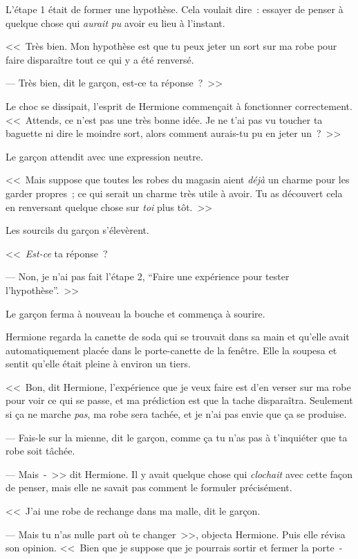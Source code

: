 L'étape 1 était de former une hypothèse. Cela voulait dire~: essayer de penser à quelque chose qui \emph{aurait} \emph{pu} avoir eu lieu à l'instant.

<<~Très bien. Mon hypothèse est que tu peux jeter un sort sur ma robe pour faire disparaître tout ce qui y a été renversé.

--- Très bien, dit le garçon, est-ce ta réponse~?~>>

Le choc se dissipait, l'esprit de Hermione commençait à fonctionner correctement. <<~Attends, ce n'est pas une très bonne idée. Je ne t'ai pas vu toucher ta baguette ni dire le moindre sort, alors comment aurais-tu pu en jeter un~?~>>

Le garçon attendit avec une expression neutre.

<<~Mais suppose que toutes les robes du magasin aient \emph{déjà} un charme pour les garder propres~; ce qui serait un charme très utile à avoir. Tu as découvert cela en renversant quelque chose sur \emph{toi} plus tôt.~>>

Les sourcils du garçon s'élevèrent.

<<~\emph{Est-ce} ta réponse~?

--- Non, je n'ai pas fait l'étape 2, “Faire une expérience pour tester l'hypothèse”.~>>

Le garçon ferma à nouveau la bouche et commença à sourire.

Hermione regarda la canette de soda qui se trouvait dans sa main et qu'elle avait automatiquement placée dans le porte-canette de la fenêtre. Elle la soupesa et sentit qu'elle était pleine à environ un tiers.

<<~Bon, dit Hermione, l'expérience que je veux faire est d'en verser sur ma robe pour voir ce qui se passe, et ma prédiction est que la tache disparaîtra. Seulement si ça ne marche \emph{pas}, ma robe sera tachée, et je n'ai pas envie que ça se produise.

--- Fais-le sur la mienne, dit le garçon, comme ça tu n'as pas à t'inquiéter que ta robe soit tâchée.

--- Mais~-~>> dit Hermione. Il y avait quelque chose qui \emph{clochait} avec cette façon de penser, mais elle ne savait pas comment le formuler précisément.

<<~J'ai une robe de rechange dans ma malle, dit le garçon.

--- Mais tu n'as nulle part où te changer~>>, objecta Hermione. Puis elle révisa son opinion. <<~Bien que je suppose que je pourrais sortir et fermer la porte~-

